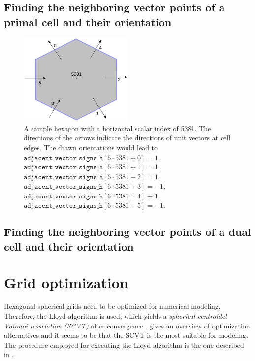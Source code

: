 \documentclass[10pt]{report}
\begin{document}
\subsection{Finding the neighboring vector points of a primal cell and their orientation}
\label{sec:finding_the_neighboring_vector_points_of_a_primal_cell_and_their_orientation}

\begin{figure}
\begin{center}
\includegraphics[width = 0.5\textwidth]{hexagonal_grid_1.pdf}
\caption{A sample hexagon with a horizontal scalar index of 5381. The directions of the arrows indicate the directions of unit vectors at cell edges. The drawn orientations would lead to $\texttt{adjacent\_vector\_signs\_h}[6\cdot 5381 + 0] = 1$, $\texttt{adjacent\_vector\_signs\_h}[6\cdot 5381 + 1] = 1$, $\texttt{adjacent\_vector\_signs\_h}[6\cdot 5381 + 2] = 1$, $\texttt{adjacent\_vector\_signs\_h}[6\cdot 5381 + 3] = -1$, $\texttt{adjacent\_vector\_signs\_h}[6\cdot 5381 + 4] = 1$, $\texttt{adjacent\_vector\_signs\_h}[6\cdot 5381 + 5] = -1$.}
\label{fig:hexagonal_grid_1}
\end{center}
\end{figure}

\subsection{Finding the neighboring vector points of a dual cell and their orientation}
\label{sec:finding_the_neighboring_vector_points_of_a_dual_cell_and_their_orientation}

\section{Grid optimization}
\label{sec:grid_optimization}

Hexagonal spherical grids need to be optimized for numerical modeling. Therefore, the Lloyd algorithm is used, which yields a \textit{spherical centroidal Voronoi tesselation (SCVT)} after convergence \cite{Du2003}. \cite{PEIXOTO201361} gives an overview of optimization alternatives and it seems to be that the SCVT is the most suitable for modeling. The procedure employed for executing the Lloyd algorithm is the one described in \cite{10.1175/MWR2991.1}.
\end{document}
